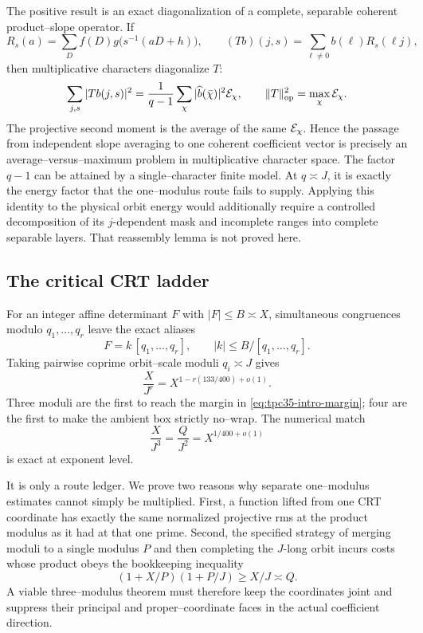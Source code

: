 The positive result is an exact diagonalization of a complete, separable
coherent product--slope operator.  If
\[
 R_s(a)=\sum_D f(D)g\bigl(s^{-1}(aD+h)\bigr),\qquad
 (Tb)(j,s)=\sum_{\ell\ne0}b(\ell)R_s(\ell j),
\]
then multiplicative characters diagonalize \(T\):
\begin{equation}
 \sum_{j,s}|Tb(j,s)|^2
 =\frac1{q-1}\sum_\chi
 |\widehat b(\bar\chi)|^2\mathcal E_\chi,
 \qquad
 \|T\|_{\operatorname{op}}^2=\max_\chi\mathcal E_\chi.
 \label{eq:tpc35-intro-character-spectrum}
\end{equation}
The projective second moment is the average of the same
\(\mathcal E_\chi\).  Hence the passage from independent slope averaging to one
coherent coefficient vector is precisely an average--versus--maximum
problem in multiplicative character space.  The factor \(q-1\) can be
attained by a single--character finite model.  At \(q\asymp J\), it is
exactly the energy factor that the one--modulus route fails to supply.
Applying this identity to the physical orbit energy would additionally
require a controlled decomposition of its \(j\)-dependent mask and
incomplete ranges into complete separable layers.  That reassembly lemma
is not proved here.

\subsection{The critical CRT ladder}

For an integer affine determinant \(F\) with \(|F|\le B\asymp X\),
simultaneous congruences modulo \(q_1,\ldots,q_r\) leave the exact aliases
\[
 F=k\,[q_1,\ldots,q_r],
 \qquad |k|\le B/[q_1,\ldots,q_r].
\]
Taking pairwise coprime orbit--scale moduli \(q_i\asymp J\) gives
\begin{equation}
 \frac{X}{J^r}
 =X^{1-r(133/400)+o(1)}.
 \label{eq:tpc35-intro-alias-ladder}
\end{equation}
Three moduli are the first to reach the margin in
\eqref{eq:tpc35-intro-margin}; four are the first to make the ambient
box strictly no--wrap.  The numerical match
\begin{equation}
 \frac{X}{J^3}=\frac{Q}{J^2}=X^{1/400+o(1)}
 \label{eq:tpc35-intro-critical-match}
\end{equation}
is exact at exponent level.

It is only a route ledger.  We prove two reasons why separate one--modulus
estimates cannot simply be multiplied.  First, a function lifted from one
CRT coordinate has exactly the same normalized projective rms at the
product modulus as it had at that one prime.  Second, the specified
strategy of merging moduli to a single modulus \(P\) and then completing
the \(J\)-long orbit incurs costs whose product obeys the bookkeeping
inequality
\begin{equation}
 (1+X/P)(1+P/J)\ge X/J\asymp Q.
 \label{eq:tpc35-intro-coverage-law}
\end{equation}
A viable three--modulus theorem must therefore keep the coordinates joint
and suppress their principal and proper--coordinate faces in the actual
coefficient direction.

